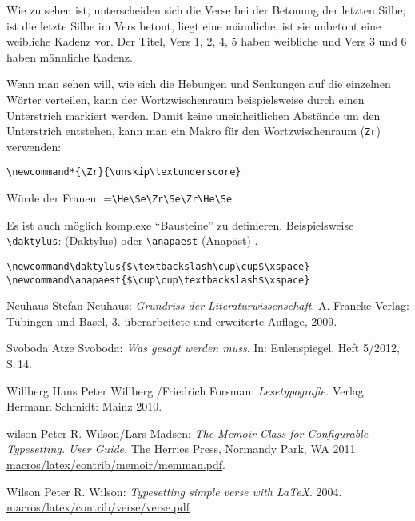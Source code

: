Wie zu sehen ist, unterscheiden sich die Verse bei der Betonung der letzten 
Silbe; ist die letzte Silbe im Vers betont, liegt eine männliche, ist sie unbetont
eine weibliche Kadenz
vor. Der Titel, Vers 1, 2, 4, 5 haben weibliche und Vers 3 und 6 haben 
männliche Kadenz.

Wenn man sehen will, wie sich die Hebungen und Senkungen auf die
einzelnen Wörter verteilen, kann der Wortzwischenraum beispielsweise
durch einen Unterstrich markiert werden. Damit keine uneinheitlichen Abstände 
um den Unterstrich entstehen, kann man ein Makro für
den Wortzwischenraum (\verb|Zr|) verwenden:

\verb|\newcommand*{\Zr}{\unskip\textunderscore}|

Würde der Frauen: \He\Se\Zr\Se\Zr\He\Se =\verb|\He\Se\Zr\Se\Zr\He\Se|



Es ist auch möglich komplexe "`Bausteine"' zu definieren. Beispielsweise
\verb|\daktylus|: \daktylus{} (Daktylus) oder \verb|\anapaest| (Anapäst) 
\anapaest.

\begin{lstlisting}
\newcommand\daktylus{$\textbackslash\cup\cup$\xspace} 
\newcommand\anapaest{$\cup\cup\textbackslash$\xspace} 
\end{lstlisting}

\small
\begin{thebibliography}{1000}
\bibitem
{Neuhaus} Stefan Neuhaus:
\textsl{Grundriss der Literaturwissenschaft}. 
A. Francke Verlag: Tübingen und Basel, 3. überarbeitete und erweiterte Auf\/lage, 
2009.

\bibitem
{Svoboda} Atze Svoboda:
\textsl{Was gesagt werden muss}.
In: Eulenspiegel, Heft 5/2012, S.\,14.

\bibitem
{Willberg} Hans Peter Willberg /Friedrich Forsman:
\textsl{Lesetypografie.}
Verlag Hermann Schmidt: Mainz 2010.

\bibitem
{wilson} Peter R. Wilson/Lars Madsen:
\textsl{The Memoir Class for Configurable Typesetting. User Guide.}
The Herries Press, Normandy Park, WA 2011.
\url{macros/latex/contrib/memoir/memman.pdf}.

\bibitem
{Wilson} Peter R. Wilson:
\textsl{Typesetting simple verse with \LaTeX }. 2004.
\url{macros/latex/contrib/verse/verse.pdf}
\end{thebibliography}

%



%
